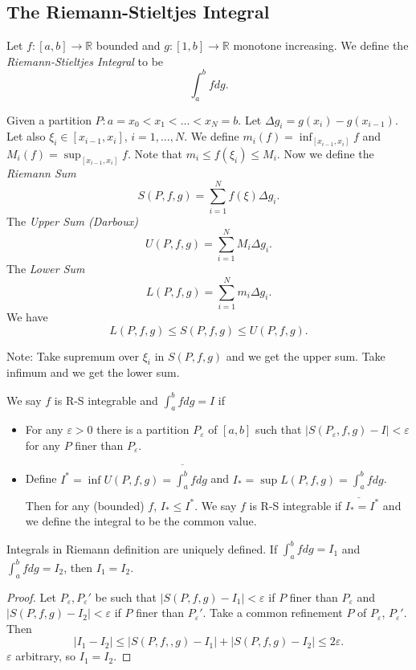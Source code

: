 \subsection{The Riemann-Stieltjes Integral}
\begin{definition}
	Let $f: [a,b] \to \mathbb{R}$ bounded and $g: [1,b] \to  \mathbb{R}$ monotone increasing. We define the \textit{Riemann-Stieltjes Integral} to be
	\[
		\int_a^b f d g
	.\]
\end{definition}
\begin{definition}
	
Given a partition $P: a = x_0 < x_1 < \ldots < x_N = b$. Let $\Delta g_i = g(x_i) - g(x_{i-1})$. Let also $\xi_i \in [x_{i-1}, x_i]$, $i = 1, \ldots, N$. We define $m_i (f) = \operatorname{inf}_{[x_{i-1}, x_i]}  f$ and $M_i(f) = \operatorname{sup} _{[x_{i-1}, x_i]}f$. Note that $m_i \le f(\xi_i) \le  M_i$. Now we define the \textit{Riemann Sum}
\[
	S(P, f, g) = \sum_{i=1}^{N} f(\xi) \Delta g_i
.\] 
The \textit{Upper Sum (Darboux)}
\[
	U(P, f, g) = \sum_{i=1}^{N} M_i \Delta g_i
.\] 
The \textit{Lower Sum}
\[
	L(P, f, g) = \sum_{i=1}^{N} m_i \Delta g_i
.\] 
We have
\[
	L(P, f, g) \le S(P, f, g) \le U(P, f, g)
.\] 
\end{definition}
Note: Take supremum over $\xi_i$ in $S(P, f, g)$ and we get the upper sum. Take infimum and we get the lower sum.

\begin{definition}[R-S Integrability]
	We say $f$ is R-S integrable and  $\int_a^b f dg =I $ if
	\begin{itemize}
		\item [(Riemann)] For any $\varepsilon>0$  there is a partition $P_\varepsilon$ of $[a,b] $ such that $\left| S(P_\varepsilon, f, g) - I \right| < \varepsilon$ for any $P $ finer than $ P_\varepsilon$.
		\item [(Darboux)] Define $I^* = \operatorname{inf} U(P, f, g) = \overline{\int _a^b} f dg$ and $I_* = \operatorname{sup} L(P, f, g)=\underline{\int _a^b} f dg$. Then for any (bounded) $f$, $I_* \le  I^*$. We say $f$ is R-S integrable if $I_* = I^*$ and we define the integral to be the common value.
	\end{itemize}
\end{definition}
\begin{proposition}
	Integrals in Riemann definition are uniquely defined. If $\int _a^b f dg = I_1$ and $\int _a^b f dg = I_2$, then $I_1 = I_2$.
\end{proposition}
\begin{proof}
	 Let $P_\varepsilon, P_\varepsilon'$ be such that $\left| S(P, f, g) - I_1 \right| <\varepsilon$ if $P$ finer than $P_\varepsilon$ and $\left| S(P, f, g) - I_2 \right| <\varepsilon$ if $P$ finer than $P_\varepsilon'$. Take a common refinement $P$ of $P_\varepsilon$, $P_\varepsilon'$. Then
	 \[
	 	\left| I_1 - I_2 \right| \le 
		\left| S(P, f,, g) - I_1 \right| + \left| S(P, f, g) - I_2 \right| \le 2 \varepsilon
	 .\] 
	 $\varepsilon$ arbitrary, so $I_1 = I_2$.
\end{proof}

